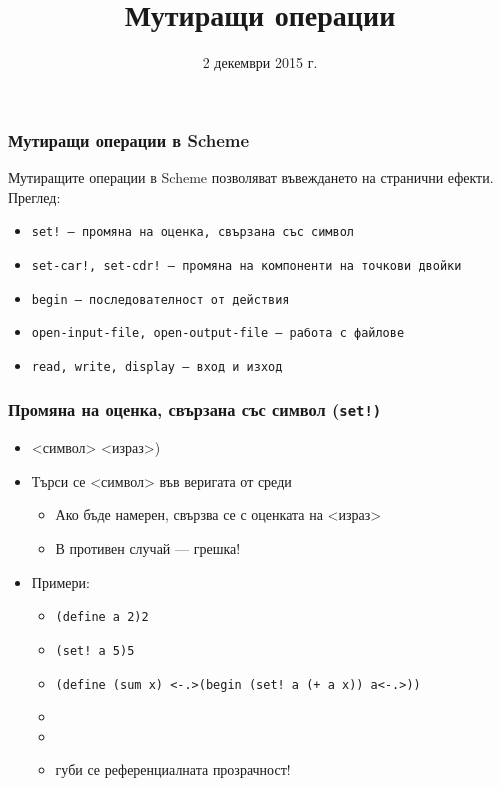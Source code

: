 \documentclass{beamer}
\title{Мутиращи операции}
\date{2 декември 2015 г.}
\begin{document}
\begin{frame}
  \titlepage
\end{frame}

\begin{frame}
  \frametitle{Мутиращи операции в Scheme}
  Мутиращите операции в Scheme позволяват въвеждането на \alert{странични ефекти}.\\[2em]
  Преглед:
  \begin{itemize}[<+->]
  \item \tt{set!} --- промяна на оценка, свързана със символ
  \item \tt{set-car!}, \tt{set-cdr!} --- промяна на компоненти на точкови двойки
  \item \tt{begin} --- последователност от действия
  \item \tt{open-input-file}, \tt{open-output-file} --- работа с файлове
  \item \tt{read}, \tt{write}, \tt{display} --- вход и изход
  \end{itemize}
\end{frame}

\begin{frame}[fragile]
  \frametitle{Промяна на оценка, свързана със символ (\tt{set!})}
  \begin{itemize}[<+->]
  \item {}<символ> <израз>\tta)
  \item Търси се <символ> във веригата от среди
    \begin{itemize}
    \item Ако бъде намерен, свързва се с оценката на <израз>
    \item В противен случай --- \alert{грешка!}
    \end{itemize}
  \item Примери:
    \begin{itemize}
    \item \tt{(define a 2)\hspace{5ex}}2
    \item \tt{(set! a 5)\hspace{7ex}}5
    \item \tt{(define (sum x) \only<-.>{(begin }(set! a (+ a x)) a\only<-.>))}\pause
    \item {}
    \item {}
    \item \alert{губи се референциалната прозрачност!}
    \end{itemize}
  \end{itemize}
\end{frame}
\end{document}
